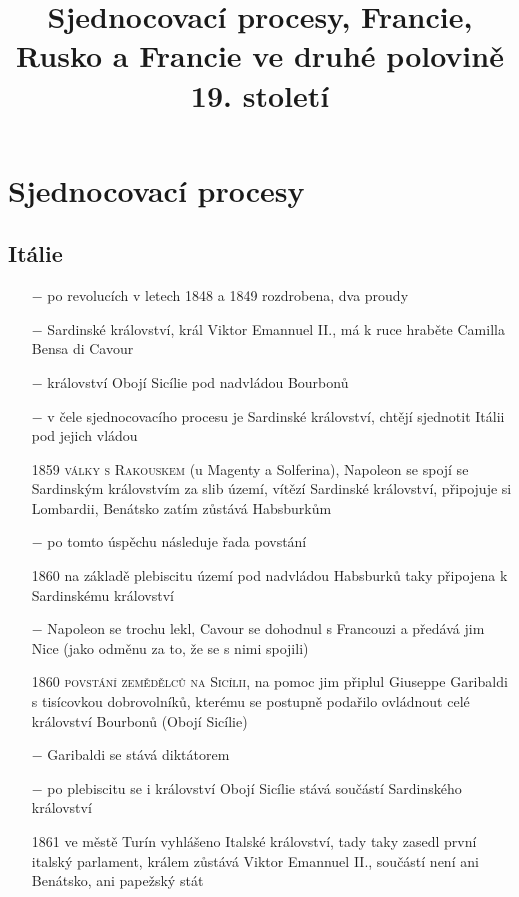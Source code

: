 \documentclass{article}
\title{\vspace{-2cm}Sjednocovací procesy, Francie, Rusko a Francie ve druhé polovině 19. století\vspace{-1.7cm}}
\date{}
\author{}
\begin{document}
\maketitle

\section*{Sjednocovací procesy}

\subsection*{Itálie}

\begin{itemize}
    \vspace{-0.5em}
    \setlength\itemsep{0.15em}
    \item[$-$] po revolucích v letech 1848 a 1849 rozdrobena, dva proudy
    \item[$-$] Sardinské království, král Viktor Emannuel II., má k ruce hraběte Camilla Bensa di Cavour
    \item[$-$] království Obojí Sicílie pod nadvládou Bourbonů
    \item[$-$]  v čele sjednocovacího procesu je Sardinské království, chtějí sjednotit Itálii pod jejich vládou
    \item[1859] \textsc{války s Rakouskem} (u Magenty a Solferina), Napoleon se spojí se Sardinským královstvím za slib území, vítězí Sardinské království, připojuje si Lombardii, Benátsko zatím zůstává Habsburkům
    \item[$-$] po tomto úspěchu následuje řada povstání
    \item[1860] na základě plebiscitu území pod nadvládou Habsburků taky připojena k Sardinskému království
    \item[$-$] Napoleon se trochu lekl, Cavour se dohodnul s Francouzi a předává jim Nice (jako odměnu za to, že se s nimi spojili)
    \item[1860] \textsc{povstání zemědělců na Sicílii}, na pomoc jim připlul Giuseppe Garibaldi s tisícovkou dobrovolníků, kterému se postupně podařilo ovládnout celé království Bourbonů (Obojí Sicílie)
    \item[$-$] Garibaldi se stává diktátorem
    \item[$-$] po plebiscitu se i království Obojí Sicílie stává součástí Sardinského království
    \item[1861] ve městě Turín vyhlášeno Italské království, tady taky zasedl první italský parlament, králem zůstává Viktor Emannuel II., součástí není ani Benátsko, ani papežský stát

\end{itemize}
\end{document}
